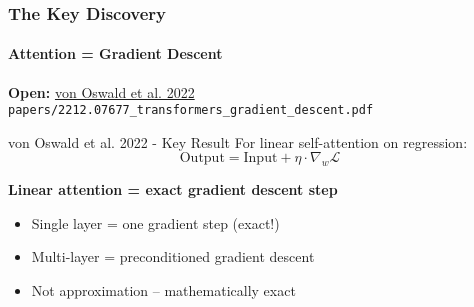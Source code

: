 \documentclass[10pt,aspectratio=169]{beamer}
\begin{document}
\begin{frame}
\frametitle{The Key Discovery}
\framesubtitle{Attention = Gradient Descent}

\begin{center}
\Large
\textbf{Open:} \href{papers/2212.07677_transformers_gradient_descent.pdf}{\color{blue}von Oswald et al. 2022}\\\small{\texttt{papers/2212.07677\_transformers\_gradient\_descent.pdf}}
\end{center}

\vspace{0.5cm}

\begin{block}{von Oswald et al. 2022 - Key Result}
\Large
For linear self-attention on regression:
\begin{equation*}
\text{Output} = \text{Input} + \eta \cdot \nabla_w \mathcal{L}
\end{equation*}
\end{block}

\vspace{0.3cm}
\textbf{Linear attention = exact gradient descent step}

\begin{itemize}
    \item Single layer = one gradient step (exact!)
    \item Multi-layer = preconditioned gradient descent
    \item Not approximation -- mathematically exact
\end{itemize}
\end{frame}

\end{document}
